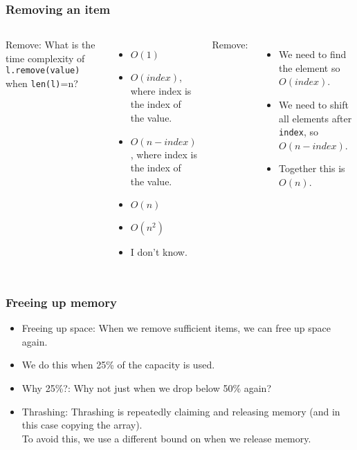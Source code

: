 \begin{frame}
	\frametitle{Removing an item}
	\begin{columns}
		Remove:
			What is the time complexity of \texttt{l.remove(value)} when \texttt{len(l)}=n?
			\begin{itemize}
				\item $O(1)$
				\item $O(\textit{index})$, where index is the index of the value.
				\item $O(n - \textit{index})$, where index is the index of the value.
				\item $O(n)$
				\item $O(n^2)$
				\item I don't know.
			\end{itemize}
		
		Remove:
		\begin{itemize}
			\item We need to find the element so $O(\textit{index})$.
			\item We need to shift all elements after \texttt{index}, so $O(n-\textit{index})$.
			\item Together this is $O(n)$.
		\end{itemize}
	\end{columns}
\end{frame}

\begin{frame}
	\frametitle{Freeing up memory}
	\begin{itemize}
		\item Freeing up space: When we remove sufficient items, we can free up space again.
		\item We do this when 25\% of the capacity is used.
	
		\item Why 25\%?:	Why not just when we drop below 50\% again?
		\item Thrashing:
		Thrashing is repeatedly claiming and releasing memory (and in this case copying the array).\\
		To avoid this, we use a different bound on when we release memory.
	\end{itemize}
\end{frame}


